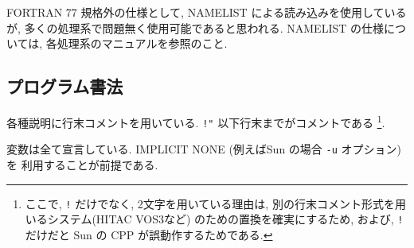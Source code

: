 \・FORTRAN 77 規格外の仕様として,
  NAMELIST による読み込みを使用しているが,
  多くの処理系で問題無く使用可能であると思われる.
  NAMELIST の仕様については, 各処理系のマニュアルを参照のこと.

\subsection{プログラム書法}

\・各種説明に行末コメントを用いている. 
  \verb+!"+ 以下行末までがコメントである 
  \footnote{ここで,  \verb+!+ だけでなく, 2文字を用いている理由は, 
            別の行末コメント形式を用いるシステム(HITAC VOS3など)
            のための置換を確実にするため, および,
            \verb+!+ だけだと Sun の CPP が誤動作するためである.}.

\・変数は全て宣言している. 
  IMPLICIT NONE (例えばSun の場合 {\tt -u} オプション)を
  利用することが前提である.

